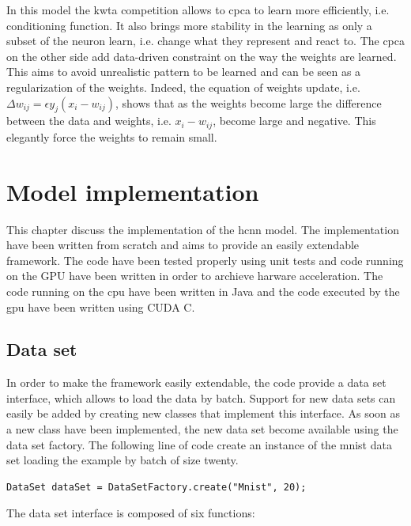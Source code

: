 \documentclass[11pt]{report}
\begin{document}
\noindent In this model the \acrshort{kwta} competition allows to \acrshort{cpca} to learn more efficiently, i.e. conditioning function. It also brings more stability in the learning as only a subset of the neuron learn, i.e. change what they represent and react to. The \acrshort{cpca} on the other side add data-driven constraint on the way the weights are learned. This aims to avoid unrealistic pattern to be learned and can be seen as a regularization of the weights. Indeed, the equation of weights update, i.e. $\Delta w_{ij} = \epsilon y_j (x_i - w_{ij})$, shows that as the weights become large the difference between the data and weights, i.e. $x_i - w_{ij}$, become large and negative. This elegantly force the weights to remain small.

\chapter{Model implementation} \label{model_implementation}

This chapter discuss the implementation of the \acrshort{hcnn} model. The implementation have been written from scratch and aims to provide an easily extendable framework. The code have been tested properly using unit tests and code running on the GPU have been written in order to archieve harware acceleration. The code running on the \acrshort{cpu} have been written in Java and the code executed by the \acrshort{gpu} have been written using CUDA C.

\section{Data set}

In order to make the framework easily extendable, the code provide a data set interface, which allows to load the data by batch. Support for new data sets can easily be added by creating new classes that implement this interface. As soon as a new class have been implemented, the new data set become available using the data set factory. The following line of code create an instance of the mnist data set loading the example by batch of size twenty.

\begin{verbatim}
DataSet dataSet = DataSetFactory.create("Mnist", 20);
\end{verbatim}

\noindent The data set interface is composed of six functions:
\end{document}
